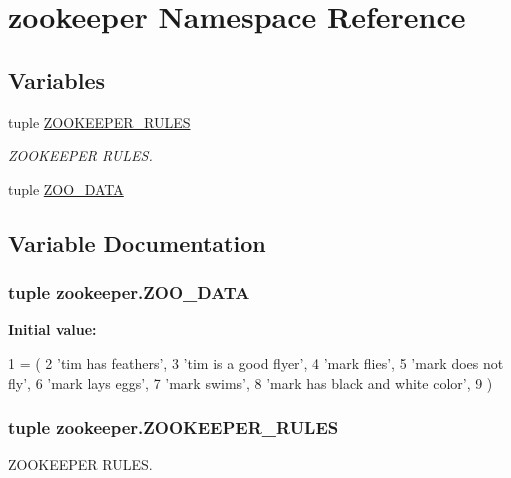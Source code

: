 \hypertarget{namespacezookeeper}{}\section{zookeeper Namespace Reference}
\label{namespacezookeeper}
\subsection*{Variables}
\begin{DoxyCompactItemize}
\item 
tuple \hyperlink{namespacezookeeper_a1f183ef62d18386f42da3134135dfbac}{Z\+O\+O\+K\+E\+E\+P\+E\+R\+\_\+\+R\+U\+L\+E\+S}
\begin{DoxyCompactList}\small\item\em Z\+O\+O\+K\+E\+E\+P\+E\+R R\+U\+L\+E\+S. \end{DoxyCompactList}\item 
tuple \hyperlink{namespacezookeeper_a28d5e10311b52cdf533ae782c9f43745}{Z\+O\+O\+\_\+\+D\+A\+T\+A}
\end{DoxyCompactItemize}


\subsection{Variable Documentation}
\hypertarget{namespacezookeeper_a28d5e10311b52cdf533ae782c9f43745}{}
\subsubsection[{Z\+O\+O\+\_\+\+D\+A\+T\+A}]{\setlength{\rightskip}{0pt plus 5cm}tuple zookeeper.\+Z\+O\+O\+\_\+\+D\+A\+T\+A}\label{namespacezookeeper_a28d5e10311b52cdf533ae782c9f43745}
{\bfseries Initial value\+:}
\begin{DoxyCode}
1 = (
2     \textcolor{stringliteral}{'tim has feathers'},
3     \textcolor{stringliteral}{'tim is a good flyer'},
4     \textcolor{stringliteral}{'mark flies'},
5     \textcolor{stringliteral}{'mark does not fly'},
6     \textcolor{stringliteral}{'mark lays eggs'},
7     \textcolor{stringliteral}{'mark swims'},
8     \textcolor{stringliteral}{'mark has black and white color'},
9     )
\end{DoxyCode}
\hypertarget{namespacezookeeper_a1f183ef62d18386f42da3134135dfbac}{}
\subsubsection[{Z\+O\+O\+K\+E\+E\+P\+E\+R\+\_\+\+R\+U\+L\+E\+S}]{\setlength{\rightskip}{0pt plus 5cm}tuple zookeeper.\+Z\+O\+O\+K\+E\+E\+P\+E\+R\+\_\+\+R\+U\+L\+E\+S}\label{namespacezookeeper_a1f183ef62d18386f42da3134135dfbac}


Z\+O\+O\+K\+E\+E\+P\+E\+R R\+U\+L\+E\+S. 


